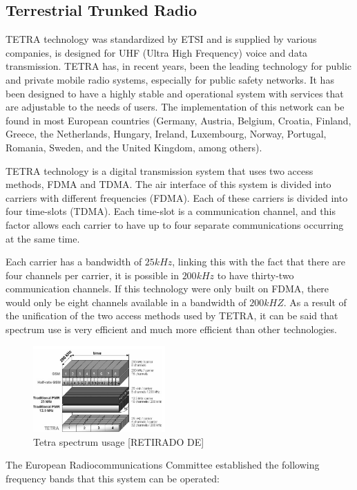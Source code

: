 \documentclass[letterpaper, 10 pt, conference]{ieeeconf}  %
\begin{document}
\subsection{Terrestrial Trunked Radio}
\noindent TETRA technology was standardized by ETSI and is supplied by various companies, is designed for UHF (Ultra High Frequency) voice and data transmission. TETRA has, in recent years, been the leading technology for public and private mobile radio systems, especially for public safety networks. It has been designed to have a highly stable and operational system with services that are adjustable to the needs of users. The implementation of this network can be found in most European countries (Germany, Austria, Belgium, Croatia, Finland, Greece, the Netherlands, Hungary, Ireland, Luxembourg, Norway, Portugal, Romania, Sweden, and the United Kingdom, among others).
\par\noindent
TETRA technology is a digital transmission system that uses two access methods, FDMA and TDMA. The air interface of this system is divided into carriers with different frequencies (FDMA). Each of these carriers is divided into four time-slots (TDMA). Each time-slot is a communication channel, and this factor allows each carrier to have up to four separate communications occurring at the same time.\par\noindent
Each carrier has a bandwidth of $25kHz$, linking this with the fact that there are four channels per carrier, it is possible in $200kHz$ to have thirty-two communication channels. If this technology were only built on FDMA, there would only be eight channels available in a bandwidth of  $200kHZ$. As a result of the unification of the two access methods used by TETRA, it can be said that spectrum use is very efficient and much more efficient than other technologies.
\begin{figure}
    \centering
    \includegraphics[width=0.45\textwidth]{TETRA_spectrum.JPG}
    \caption{Tetra spectrum usage [RETIRADO DE]}
    \label{fig:TETRAspectrum}
\end{figure}
The European Radiocommunications Committee established  the following frequency bands that this system can be operated:
\end{document}
